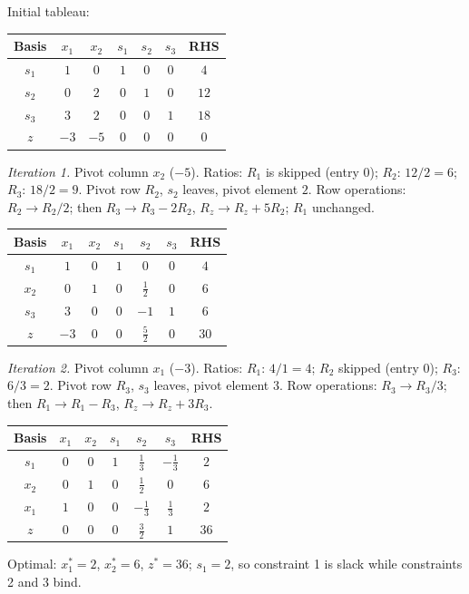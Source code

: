 \begin{solutions}
  \item Initial tableau:
        \begin{center}
        \begin{tabular}{c|ccccc|c}
        Basis & $x_1$ & $x_2$ & $s_1$ & $s_2$ & $s_3$ & RHS\\
        \hline
        $s_1$ & $1$ & $0$ & $1$ & $0$ & $0$ & $4$\\
        $s_2$ & $0$ & $2$ & $0$ & $1$ & $0$ & $12$\\
        $s_3$ & $3$ & $2$ & $0$ & $0$ & $1$ & $18$\\
        \hline
        $z$ & $-3$ & $-5$ & $0$ & $0$ & $0$ & $0$\\
        \end{tabular}
        \end{center}
        \emph{Iteration 1.} Pivot column $x_2$ ($-5$). Ratios: $R_1$ is
        skipped (entry $0$); $R_2$: $12/2=6$; $R_3$: $18/2=9$. Pivot row
        $R_2$, $s_2$ leaves, pivot element $2$. Row operations:
        $R_2\to R_2/2$; then $R_3\to R_3-2R_2$, $R_z\to R_z+5R_2$;
        $R_1$ unchanged.
        \begin{center}
        \begin{tabular}{c|ccccc|c}
        Basis & $x_1$ & $x_2$ & $s_1$ & $s_2$ & $s_3$ & RHS\\
        \hline
        $s_1$ & $1$ & $0$ & $1$ & $0$ & $0$ & $4$\\
        $x_2$ & $0$ & $1$ & $0$ & $\tfrac{1}{2}$ & $0$ & $6$\\
        $s_3$ & $3$ & $0$ & $0$ & $-1$ & $1$ & $6$\\
        \hline
        $z$ & $-3$ & $0$ & $0$ & $\tfrac{5}{2}$ & $0$ & $30$\\
        \end{tabular}
        \end{center}
        \emph{Iteration 2.} Pivot column $x_1$ ($-3$). Ratios: $R_1$:
        $4/1=4$; $R_2$ skipped (entry $0$); $R_3$: $6/3=2$. Pivot row
        $R_3$, $s_3$ leaves, pivot element $3$. Row operations:
        $R_3\to R_3/3$; then $R_1\to R_1-R_3$, $R_z\to R_z+3R_3$.
        \begin{center}
        \begin{tabular}{c|ccccc|c}
        Basis & $x_1$ & $x_2$ & $s_1$ & $s_2$ & $s_3$ & RHS\\
        \hline
        $s_1$ & $0$ & $0$ & $1$ & $\tfrac{1}{3}$ & $-\tfrac{1}{3}$ & $2$\\
        $x_2$ & $0$ & $1$ & $0$ & $\tfrac{1}{2}$ & $0$ & $6$\\
        $x_1$ & $1$ & $0$ & $0$ & $-\tfrac{1}{3}$ & $\tfrac{1}{3}$ & $2$\\
        \hline
        $z$ & $0$ & $0$ & $0$ & $\tfrac{3}{2}$ & $1$ & $36$\\
        \end{tabular}
        \end{center}
        Optimal: $x_1^{*}=2$, $x_2^{*}=6$, $z^{*}=36$; $s_1=2$, so
        constraint 1 is slack while constraints 2 and 3 bind.


\end{solutions}
